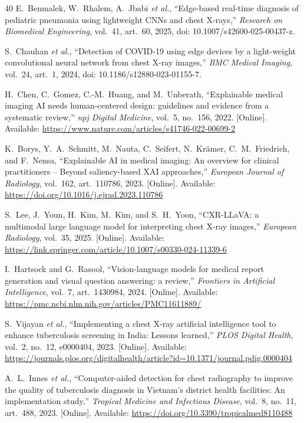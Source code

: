 \documentclass[conference, letterpaper]{IEEEtran}
\begin{document}
\begin{thebibliography}{40}
E.~Benmalek, W.~Rhalem, A.~Jbabi \textit{et al.}, ``Edge-based real-time diagnosis of pediatric pneumonia using lightweight CNNs and chest X-rays,'' \textit{Research on Biomedical Engineering}, vol.~41, art.~60, 2025, doi: 10.1007/s42600-025-00437-z.

S.~Chauhan \textit{et al.}, ``Detection of COVID-19 using edge devices by a light-weight convolutional neural network from chest X-ray images,'' \textit{BMC Medical Imaging}, vol.~24, art.~1, 2024, doi: 10.1186/s12880-023-01155-7.


H.~Chen, C.~Gomez, C.-M.~Huang, and M.~Unberath, ``Explainable medical imaging AI needs human-centered design: guidelines and evidence from a systematic review,'' \textit{npj Digital Medicine}, vol.~5, no.~156, 2022. [Online]. Available: \url{https://www.nature.com/articles/s41746-022-00699-2}

K.~Borys, Y.~A.~Schmitt, M.~Nauta, C.~Seifert, N.~Kr\"{a}mer, C.~M.~Friedrich, and F.~Nensa, ``Explainable AI in medical imaging: An overview for clinical practitioners -- Beyond saliency-based XAI approaches,'' \textit{European Journal of Radiology}, vol.~162, art.~110786, 2023. [Online]. Available: \url{https://doi.org/10.1016/j.ejrad.2023.110786}

S.~Lee, J.~Youn, H.~Kim, M.~Kim, and S.~H.~Yoon, ``CXR-LLaVA: a multimodal large language model for interpreting chest X-ray images,'' \textit{European Radiology}, vol.~35, 2025. [Online]. Available: \url{https://link.springer.com/article/10.1007/s00330-024-11339-6}

I.~Hartsock and G.~Rasool, ``Vision-language models for medical report generation and visual question answering: a review,'' \textit{Frontiers in Artificial Intelligence}, vol.~7, art.~1430984, 2024. [Online]. Available: \url{https://pmc.ncbi.nlm.nih.gov/articles/PMC11611889/}

S.~Vijayan \textit{et al.}, ``Implementing a chest X-ray artificial intelligence tool to enhance tuberculosis screening in India: Lessons learned,'' \textit{PLOS Digital Health}, vol.~2, no.~12, e0000404, 2023. [Online]. Available: \url{https://journals.plos.org/digitalhealth/article?id=10.1371/journal.pdig.0000404}

A.~L.~Innes \textit{et al.}, ``Computer-aided detection for chest radiography to improve the quality of tuberculosis diagnosis in Vietnam's district health facilities: An implementation study,'' \textit{Tropical Medicine and Infectious Disease}, vol.~8, no.~11, art.~488, 2023. [Online]. Available: \url{https://doi.org/10.3390/tropicalmed8110488}


\end{thebibliography}
\end{document}
